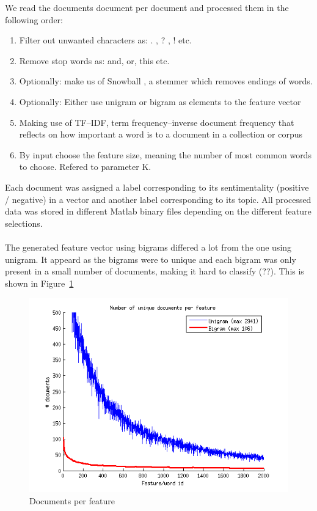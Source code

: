 We read the documents document per document and processed them in the following order: 
\begin{enumerate}
\item Filter out unwanted characters as: . , ? , ! etc.
\item Remove stop words as: and, or, this etc.
\item Optionally: make us of Snowball \citep{snowball_url}, a stemmer which removes endings of words.
\item Optionally: Either use unigram or bigram as elements to the feature vector
\item Making use of TF–IDF, term frequency–inverse document frequency that
reflects on how important a word is to a document in a collection or corpus
\item By input choose the feature size, meaning the number of most common words to choose. Refered to parameter K.
\end{enumerate}
Each document was assigned a label corresponding to its sentimentality (positive / negative) in a vector and another label corresponding to its topic. All processed data was stored in different Matlab binary files depending on the different feature selections. 
\\\\
The generated feature vector using bigrams differed a lot from the one using unigram. It appeard as the bigrams were to unique and each bigram was only present in a small number of documents, making it hard to classify (??). This is shown in Figure~\ref{fig:docperfeature} 
\begin{figure}[h!]
\centering
\includegraphics[scale = 0.5]{fig/documents_per_feature.png}
\caption{Documents per feature}
\label{fig:docperfeature}
\end{figure} \\

